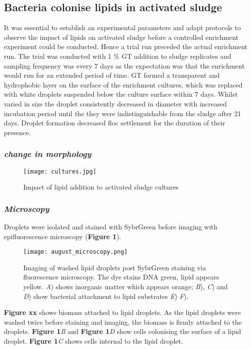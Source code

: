 \documentclass[11pt]{article}
\begin{document}
\subsection{Bacteria colonise lipids in activated sludge}
It was essential to establish an experimental parameters and adapt protocols to observe the impact of lipids on activated sludge before a controlled enrichment experiment could be conducted. Hence a trial run preceded the actual enrichment run. The trial was conducted with 1 \% GT  addition to sludge replicates and sampling frequency was every 7 days as the expectation was that the enrichment would run for an extended period of time. GT formed a transparent and hydrophobic layer on the surface of the enrichment cultures, which was replaced with white droplets suspended below the culture surface within 7 days. Whilst varied in size the droplet consistently decreased in diameter with increased incubation period until the they were indistinguishable from the sludge after 21 days. Droplet formation decreased floc settlement for the duration of their presence. 

\subsubsection{\emph{change in morphology}}
\begin{figure}
\texttt{[image: cultures.jpg]}
\caption{Impact of lipid addition to activated sludge cultures}
\end{figure}


\subsubsection{\emph{Microscopy}}
 Droplets were isolated and stained with SybrGreen before imaging with epifluorescence microscopy (\textbf{Figure 1}). 

\begin{figure}
\texttt{[image: august\_microscopy.png]}
\caption{Imaging of washed lipid droplets post SybrGreen staining via fluorescence microscopy. The dye stains DNA green, lipid appears yellow. \textit{A}) shows inorganic matter which appears orange; \textit{B}), \textit{C}) and \textit{D}) show bacterial attachment to lipid substrates \textit{E}) \textit{F}).}
\end{figure}


\textbf{Figure xx } shows biomass attached to lipid droplets. As the lipid droplets were washed twice before staining and imaging, the biomass is firmly attached to the droplets. \textbf{Figure 1}\textit{B} and \textbf{Figure 1}\textit{D} show cells colonising the surface of a lipid droplet. \textbf{Figure 1}\textit{C} shows cells internal to the lipid droplet.
\end{document}
